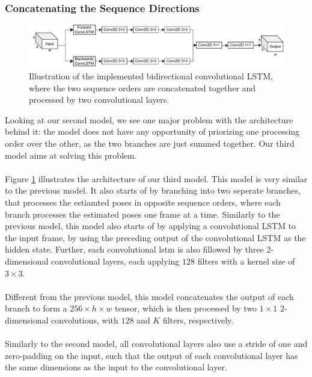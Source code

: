 \documentclass[./main.tex]{subfiles}
\begin{document}
\subsubsection{Concatenating the Sequence Directions}
\begin{figure}[htbp]
    \centering
    \includegraphics[width=\textwidth]{./entities/unipose2.pdf}
    \caption{Illustration of the implemented bidirectional convolutional LSTM, where the two sequence orders are concatenated together and processed by two convolutional layers.}
    \label{fig:unipose2}
\end{figure}

\noindent Looking at our second model, we see one major problem with the architecture behind it: the model does not have any opportunity of priorizing one processing order over the other, as the two branches are just summed together. Our third model aims at solving this problem.
\\
\\
Figure \ref{fig:unipose2} illustrates the architecture of our third model. This model is very similar to the previous model. It also starts of by branching into two seperate branches, that processes the estiamted poses in opposite sequence orders, where each branch processes the estimated poses one frame at a time. Similarly to the previous model, this model also starts of by applying a convolutional LSTM to the input frame, by using the preceding output of the convolutional LSTM as the hidden state. Further, each convolutional lstm is also fillowed by three 2-dimensional convolutional layers, each applying $128$ filters with a kernel size of $3 \times 3$. 
\\
\\
Different from the previous model, this model concatenates the output of each branch to form a $256 \times h \times w$ tensor, which is then processed by two $1 \times 1$ 2-dimensional convolutions, with $128$ and $K$ filters, respectively.
\\
\\
Similarly to the second model, all convolutional layers also use a stride of one and zero-padding on the input, such that the output of each convolutional layer has the same dimensions as the input to the convolutional layer.
\end{document}
